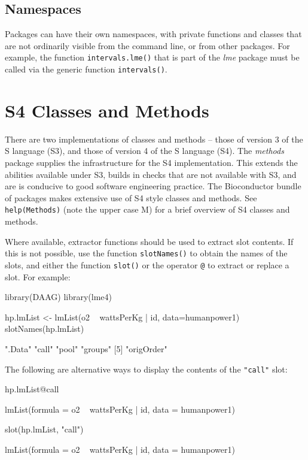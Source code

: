\documentclass{tufte-book}\usepackage[]{graphicx}\usepackage[]{color}
\newcommand{\txtt}[1]{\texttt{#1}}
\begin{document}
\subsection*{Namespaces}
Packages can have their own namespaces, with private functions and
classes that are not ordinarily visible from the command line, or from
other packages.  For example, the function \txtt{intervals.lme()}
that is part of the \textit{lme} package must be called via the generic
function \txtt{intervals()}.

\section{S4 Classes and Methods}\label{sec:s4}
There are two implementations of classes and methods -- those of
version 3 of the S language (S3), and those of version 4 of the S
language (S4).  The \textit{methods} package supplies the
infrastructure for the S4 implementation. This extends the abilities
available under S3, builds in checks that are not available with S3,
and are is conducive to good software engineering practice.  The
Bioconductor bundle of packages makes extensive use of S4 style
classes and methods. See \txtt{help(Methods)} (note the upper case M)
for a brief overview of S4 classes and methods.

Where available, extractor functions should be used to extract slot
contents. If this is not possible, use the function
\txtt{slotNames()} to obtain the names of the slots, and either the
function \txtt{slot()} or the operator \verb!@! to extract or
replace a slot.  For example:
\begin{Schunk}
\begin{Sinput}
library(DAAG)
library(lme4)
\end{Sinput}
\begin{Sinput}
hp.lmList <- lmList(o2 ~ wattsPerKg | id,
                    data=humanpower1)
slotNames(hp.lmList)
\end{Sinput}
\begin{Soutput}
[1] ".Data"     "call"      "pool"      "groups"   
[5] "origOrder"
\end{Soutput}
\end{Schunk}

The following are alternative ways to display the contents of the
\txtt{"call"} slot:
\begin{fullwidth}
\begin{Schunk}
\begin{Sinput}
hp.lmList@call
\end{Sinput}
\begin{Soutput}
lmList(formula = o2 ~ wattsPerKg | id, data = humanpower1)
\end{Soutput}
\begin{Sinput}
slot(hp.lmList, "call")
\end{Sinput}
\begin{Soutput}
lmList(formula = o2 ~ wattsPerKg | id, data = humanpower1)
\end{Soutput}
\end{Schunk}
\end{fullwidth}
\end{document}
